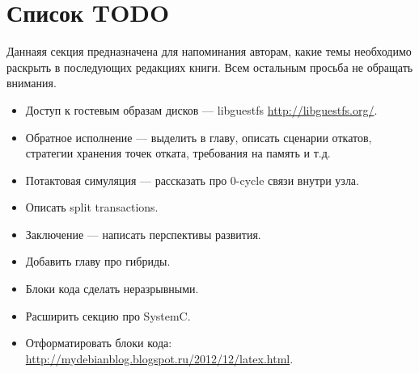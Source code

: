 \section*{Список TODO}

Даннаяя секция предназначена для напоминания авторам, какие темы необходимо раскрыть в последующих редакциях книги. Всем остальным просьба не обращать внимания.

\begin{itemize}
    \item Доступ к гостевым образам дисков --- libguestfs \url{http://libguestfs.org/}.
    \item Обратное исполнение --- выделить в главу, описать сценарии откатов, стратегии хранения точек отката, требования на память и т.д.
    \item Потактовая симуляция --- рассказать про 0-cycle связи внутри узла.
    \item Описать split transactions.
    \item Заключение --- написать перспективы развития.
	\item Добавить главу про гибриды.
	\item Блоки кода сделать неразрывными.
	\item Расширить секцию про SystemC.
	\item Отформатировать блоки кода: \url{http://mydebianblog.blogspot.ru/2012/12/latex.html}.
\end{itemize}


 


